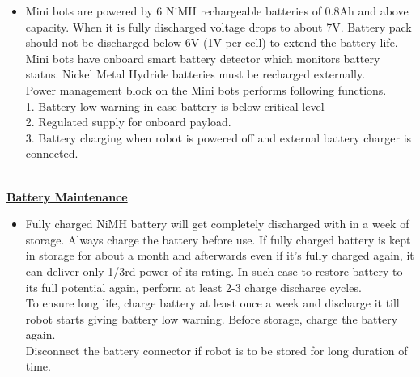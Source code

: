 \documentclass[a4paper,12pt,oneside]{book}
\begin{document}
	\begin{itemize}
	\item {Mini bots are powered by 6 NiMH rechargeable batteries of 0.8Ah and above capacity. When it is
	fully discharged voltage drops to about 7V. Battery pack should not be discharged below 6V (1V
	per cell) to extend the battery life. Mini bots have onboard smart battery detector which monitors
	battery status. Nickel Metal Hydride batteries must be recharged externally.\\
	Power management block on the Mini bots performs following functions.\\
	1. Battery low warning in case battery is below critical level\\
	2. Regulated supply for onboard payload.\\
	3. Battery charging when robot is powered off and external battery charger is
	connected.\\}
	\end{itemize}
	\hfill\\	
	\underline{\textbf{\Large{Battery Maintenance}}}
	\begin{itemize}
		\item {Fully charged NiMH battery will get completely discharged with in a week of storage. Always
			charge the battery before use. If fully charged battery is kept in storage for about a month and
			afterwards even if it’s fully charged again, it can deliver only 1/3rd power of its rating. In such
			case to restore battery to its full potential again, perform at least 2-3 charge discharge cycles.\\
			To ensure long life, charge battery at least once a week and discharge it till robot starts giving
			battery low warning. Before storage, charge the battery again.\\
			Disconnect the battery connector if robot is to be stored for long duration of time.}
	\end{itemize}
	
\end{document}
